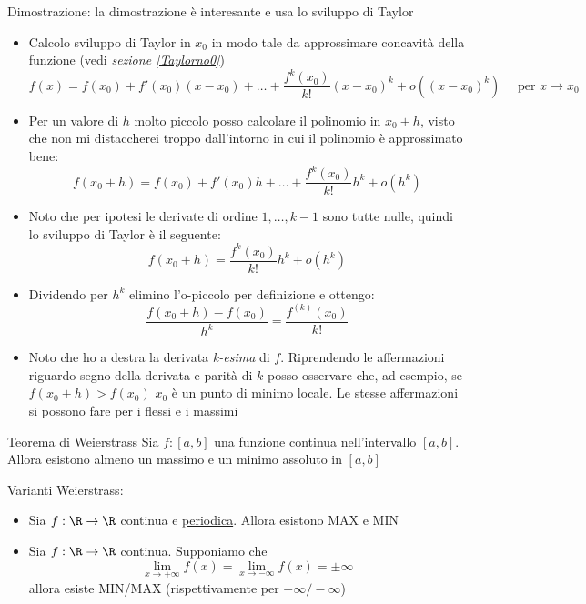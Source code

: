Dimostrazione: la dimostrazione è interesante e usa lo sviluppo di Taylor
\begin{itemize}
	\item Calcolo sviluppo di Taylor in $  x_0 $ in modo tale da approssimare concavità della funzione (vedi \textit{sezione \ref{Taylorno0}})
	      \[
		      f\left( x \right) = f\left( x_0 \right)  + f'\left( x_0 \right) \left( x-x_0 \right) +\ldots+ \frac{f^{k}\left( x_0 \right)}{k!}\left( x-x_0 \right) ^{k} + o\left( \left( x-x_0 \right) ^{k} \right)  \quad \text{ per } x \to x_0
	      \]
	\item Per un valore di $ h $ molto piccolo posso calcolare il polinomio in $ x_0+h $, visto che non mi distaccherei troppo dall'intorno in cui il polinomio è approssimato bene:
	      \[
		      f\left( x_0+h \right) = f\left( x_0 \right) + f'\left( x_0 \right) h + \ldots + \frac{f^{k}\left( x_0 \right)}{k!}h^{k} + o \left( h^{k} \right)
	      \]
	\item Noto che per ipotesi le derivate di ordine $ 1,\ldots,k-1 $ sono tutte nulle, quindi lo sviluppo di Taylor è il seguente:
	      \[
		      f\left( x_0+h \right) = \frac{f^{k}\left( x_0 \right)}{k!}h^{k}+ o\left( h^{k} \right)
	      \]
	\item Dividendo per $ h^{k} $ elimino l'o-piccolo per definizione e ottengo:
	      \[
		      \frac{f\left( x_0+h \right)- f\left( x_0 \right) }{h^{k}}= \frac{f^{\left( k \right) }\left( x_0 \right) }{k!}
	      \]
	\item Noto che ho a destra la derivata \textit{k-esima} di $ f $. Riprendendo le affermazioni riguardo segno della derivata e parità di $ k $ posso osservare che, ad esempio, se $ f\left( x_0 +h\right)  > f\left( x_0 \right) $ $ x_0 $ è un punto di minimo locale. Le stesse affermazioni si possono fare per i flessi e i massimi
\end{itemize}

\begin{teorema}{Teorema di Weierstrass}
	Sia $f : \left[ a,b \right] $ una funzione continua nell'intervallo $\left[ a,b \right] $. Allora esistono almeno un massimo e un minimo assoluto in $\left[ a,b \right] $
\end{teorema}

Varianti Weierstrass:
\begin{itemize}
	\item Sia $  f: \R \to \R $ continua e \underline{periodica}. Allora esistono MAX e MIN
	\item Sia $  f: \R \to \R $ continua. Supponiamo che
	      \[
		      \lim_{x \to +\infty} f(x) = \lim_{x \to -\infty} f(x) = \pm \infty
	      \]
	      allora esiste MIN/MAX (rispettivamente per $ +\infty/-\infty $)
\end{itemize}

